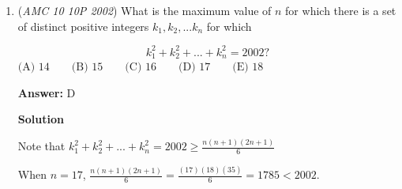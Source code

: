 \begin{enumerate}
 \begin{align*}a-b&=\frac{(2^2-1^2)}{3}+\frac{(3^2-2^2)}{5}+\frac{4^2-3^2}{7} + \; \dots \; + \frac{1001^2-1000^2}{2001} + 1 - \frac{1001^2}{2003} \\&=1001-\frac{1001^2}{2003} \\&>1001-\frac{1001^2}{2002} \\&=1001-\frac{1001}{2} \\&=\frac{1001}{2} \\&=500.5 \\\end{align*}


 Since $a-b>500.5,$ we can conclude that $a-b$ is closer to $501$ than $500.$

 Thus, our answer is  $\boxed{\textbf{(B) } 501}.$




\textbf{Solution 2}

In sigma notation, $a$ and $b$ are $\sum_{k=1}^{1001} \frac{k^2}{2k-1}$ and $\sum_{k=1}^{1001} \frac{k^2}{2k+1}$ respectively. $a-b= \sum_{k=1}^{1001} \frac{k^2}{2k-1} - \sum_{k=1}^{1001} \frac{k^2}{2k+1} = \sum_{k=1}^{1001} (\frac{k^2}{2k-1} - \frac{k^2}{2k+1})$. Combining the fractions, $\frac{k^2}{2k-1} - \frac{k^2}{2k+1} = \frac{2k^2}{4k^2-1}$ and this can be rewritten as $\frac{1}{2}\cdot\frac{4k^2}{4k^2-1}=\frac{1}{2}\left(1+\frac{1}{4k^2-1}\right)$. Substituting back, we get $\sum_{k=1}^{1001}\left(\frac{1}{2}\left(1+\frac{1}{4k^2-1}\right)\right) = \frac{1}{2}\left(\sum_{k=1}^{1001} 1 + \sum_{k=1}^{1001}\left(\frac{1}{2k-1}-\frac{1}{2k+1}\right)\right)=\frac{1001}{2}+\frac{1001}{2003}\approx 501$. So, the answer is $\boxed{\textbf{(B) } 501}.$~J.zz.z

 


	\item (\textit{AMC 10 10P 2002}) What is the maximum value of $n$ for which there is a set of distinct positive integers $k_1, k_2, ... k_n$ for which


 
 \[k^2_1 + k^2_2 + ... + k^2_n = 2002?\]
$\text{(A) }14 \qquad \text{(B) }15 \qquad \text{(C) }16 \qquad \text{(D) }17 \qquad \text{(E) }18$

 \textbf{Answer: }D



\textbf{Solution}

Note that $k^2_1 + k^2_2 + ... + k^2_n = 2002 \geq \frac{n(n+1)(2n+1)}{6}$

 When $n = 17$, $\frac{n(n+1)(2n+1)}{6} = \frac{(17)(18)(35)}{6} = 1785 < 2002$.


\end{enumerate}

